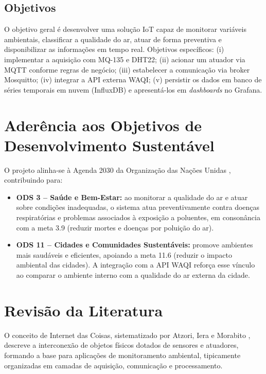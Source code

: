\documentclass[12pt,a4paper]{article}
\begin{document}
\subsection{Objetivos}

O objetivo geral é desenvolver uma solução IoT capaz de monitorar variáveis ambientais, classificar a
qualidade do ar, atuar de forma preventiva e disponibilizar as informações em tempo real. Objetivos
específicos: (i) implementar a aquisição com MQ-135 e DHT22; (ii) acionar um atuador via MQTT conforme
regras de negócio; (iii) estabelecer a comunicação via broker Mosquitto; (iv) integrar a API externa
WAQI; (v) persistir os dados em banco de séries temporais em nuvem (InfluxDB) e apresentá-los em
\textit{dashboards} no Grafana.

\section{Aderência aos Objetivos de Desenvolvimento Sustentável}

O projeto alinha-se à Agenda 2030 da Organização das Nações Unidas \cite{onu2015}, contribuindo para:

\begin{itemize}
  \item \textbf{ODS 3 -- Saúde e Bem-Estar:} ao monitorar a qualidade do ar e atuar sobre condições
  inadequadas, o sistema atua preventivamente contra doenças respiratórias e problemas associados à
  exposição a poluentes, em consonância com a meta 3.9 (reduzir mortes e doenças por poluição do ar).
  \item \textbf{ODS 11 -- Cidades e Comunidades Sustentáveis:} promove ambientes mais saudáveis e
  eficientes, apoiando a meta 11.6 (reduzir o impacto ambiental das cidades). A integração com a API WAQI
  reforça esse vínculo ao comparar o ambiente interno com a qualidade do ar externa da cidade.
\end{itemize}

\section{Revisão da Literatura}

O conceito de Internet das Coisas, sistematizado por Atzori, Iera e Morabito \cite{atzori2010}, descreve
a interconexão de objetos físicos dotados de sensores e atuadores, formando a base para aplicações de
monitoramento ambiental, tipicamente organizadas em camadas de aquisição, comunicação e processamento.
\end{document}
